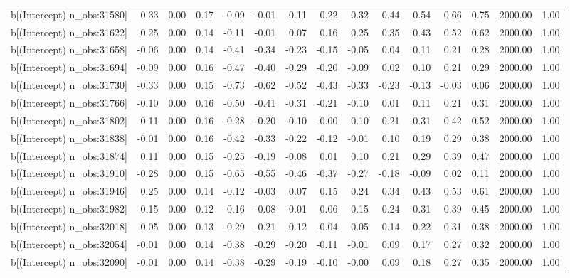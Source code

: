 \begin{table}[ht]
\begin{tabular}{rrrrrrrrrrrrrrr}
  b[(Intercept) n\_obs:31580] & 0.33 & 0.00 & 0.17 & -0.09 & -0.01 & 0.11 & 0.22 & 0.32 & 0.44 & 0.54 & 0.66 & 0.75 & 2000.00 & 1.00 \\ 
  b[(Intercept) n\_obs:31622] & 0.25 & 0.00 & 0.14 & -0.11 & -0.01 & 0.07 & 0.16 & 0.25 & 0.35 & 0.43 & 0.52 & 0.62 & 2000.00 & 1.00 \\ 
  b[(Intercept) n\_obs:31658] & -0.06 & 0.00 & 0.14 & -0.41 & -0.34 & -0.23 & -0.15 & -0.05 & 0.04 & 0.11 & 0.21 & 0.28 & 2000.00 & 1.00 \\ 
  b[(Intercept) n\_obs:31694] & -0.09 & 0.00 & 0.16 & -0.47 & -0.40 & -0.29 & -0.20 & -0.09 & 0.02 & 0.10 & 0.21 & 0.29 & 2000.00 & 1.00 \\ 
  b[(Intercept) n\_obs:31730] & -0.33 & 0.00 & 0.15 & -0.73 & -0.62 & -0.52 & -0.43 & -0.33 & -0.23 & -0.13 & -0.03 & 0.06 & 2000.00 & 1.00 \\ 
  b[(Intercept) n\_obs:31766] & -0.10 & 0.00 & 0.16 & -0.50 & -0.41 & -0.31 & -0.21 & -0.10 & 0.01 & 0.11 & 0.21 & 0.31 & 2000.00 & 1.00 \\ 
  b[(Intercept) n\_obs:31802] & 0.11 & 0.00 & 0.16 & -0.28 & -0.20 & -0.10 & -0.00 & 0.10 & 0.21 & 0.31 & 0.42 & 0.52 & 2000.00 & 1.00 \\ 
  b[(Intercept) n\_obs:31838] & -0.01 & 0.00 & 0.16 & -0.42 & -0.33 & -0.22 & -0.12 & -0.01 & 0.10 & 0.19 & 0.29 & 0.38 & 2000.00 & 1.00 \\ 
  b[(Intercept) n\_obs:31874] & 0.11 & 0.00 & 0.15 & -0.25 & -0.19 & -0.08 & 0.01 & 0.10 & 0.21 & 0.29 & 0.39 & 0.47 & 2000.00 & 1.00 \\ 
  b[(Intercept) n\_obs:31910] & -0.28 & 0.00 & 0.15 & -0.65 & -0.55 & -0.46 & -0.37 & -0.27 & -0.18 & -0.09 & 0.02 & 0.11 & 2000.00 & 1.00 \\ 
  b[(Intercept) n\_obs:31946] & 0.25 & 0.00 & 0.14 & -0.12 & -0.03 & 0.07 & 0.15 & 0.24 & 0.34 & 0.43 & 0.53 & 0.61 & 2000.00 & 1.00 \\ 
  b[(Intercept) n\_obs:31982] & 0.15 & 0.00 & 0.12 & -0.16 & -0.08 & -0.01 & 0.06 & 0.15 & 0.24 & 0.31 & 0.39 & 0.45 & 2000.00 & 1.00 \\ 
  b[(Intercept) n\_obs:32018] & 0.05 & 0.00 & 0.13 & -0.29 & -0.21 & -0.12 & -0.04 & 0.05 & 0.14 & 0.22 & 0.31 & 0.38 & 2000.00 & 1.00 \\ 
  b[(Intercept) n\_obs:32054] & -0.01 & 0.00 & 0.14 & -0.38 & -0.29 & -0.20 & -0.11 & -0.01 & 0.09 & 0.17 & 0.27 & 0.32 & 2000.00 & 1.00 \\ 
  b[(Intercept) n\_obs:32090] & -0.01 & 0.00 & 0.14 & -0.38 & -0.29 & -0.19 & -0.10 & -0.00 & 0.09 & 0.18 & 0.27 & 0.35 & 2000.00 & 1.00 \\ 

\end{tabular}
\end{table}
